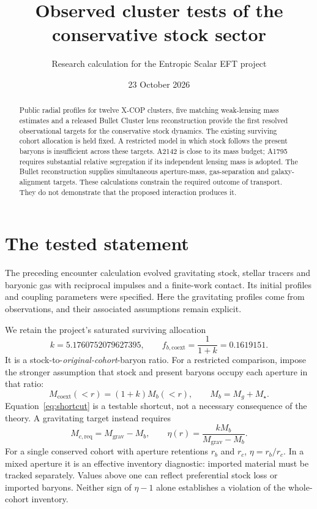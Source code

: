 \documentclass[11pt]{article}
\title{Observed cluster tests of the conservative stock sector}
\author{Research calculation for the Entropic Scalar EFT project}
\date{23 October 2026}
\begin{document}
\maketitle
\begin{abstract}
Public radial profiles for twelve X-COP clusters, five matching weak-lensing mass estimates and a released Bullet Cluster lens reconstruction provide the first resolved observational targets for the conservative stock dynamics. The existing surviving cohort allocation is held fixed. A restricted model in which stock follows the present baryons is insufficient across these targets. A2142 is close to its mass budget; A1795 requires substantial relative segregation if its independent lensing mass is adopted. The Bullet reconstruction supplies simultaneous aperture-mass, gas-separation and galaxy-alignment targets. These calculations constrain the required outcome of transport. They do not demonstrate that the proposed interaction produces it.
\end{abstract}

\section{The tested statement}
The preceding encounter calculation evolved gravitating stock, stellar tracers and baryonic gas with reciprocal impulses and a finite-work contact. Its initial profiles and coupling parameters were specified. Here the gravitating profiles come from observations, and their associated assumptions remain explicit.

We retain the project's saturated surviving allocation
\begin{equation}
k=5.1760752079627395,\qquad f_{b,\mathrm{coext}}=\frac{1}{1+k}=0.1619151.
\end{equation}
It is a stock-to-\emph{original-cohort}-baryon ratio. For a restricted comparison, impose the stronger assumption that stock and present baryons occupy each aperture in that ratio:
\begin{equation}
M_{\mathrm{coext}}(<r)=(1+k)M_b(<r),\qquad M_b=M_g+M_\star.
\label{eq:shortcut}
\end{equation}
Equation~\eqref{eq:shortcut} is a testable shortcut, not a necessary consequence of the theory. A gravitating target instead requires
\begin{equation}
M_{c,\mathrm{req}}=M_{\mathrm{grav}}-M_b,\qquad
\eta(r)=\frac{kM_b}{M_{\mathrm{grav}}-M_b}.
\label{eq:eta}
\end{equation}
For a single conserved cohort with aperture retentions $r_b$ and $r_c$, $\eta=r_b/r_c$. In a mixed aperture it is an effective inventory diagnostic: imported material must be tracked separately. Values above one can reflect preferential stock loss or imported baryons. Neither sign of $\eta-1$ alone establishes a violation of the whole-cohort inventory.
\end{document}
